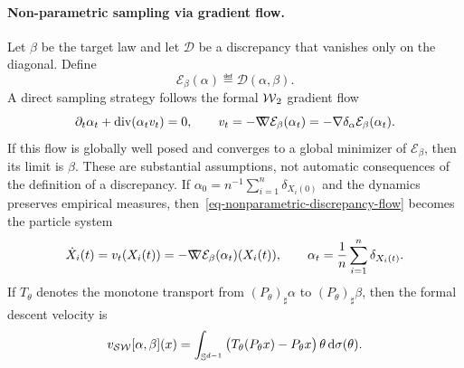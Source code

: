 \paragraph{Non-parametric sampling via gradient flow.}
Let $\beta$ be the target law and let $\mathcal D$ be a discrepancy that vanishes only on the diagonal. Define
\begin{equation}\label{eq-one-step-discrepancy-energy}
\mathcal E_\beta(\alpha)\eqdef\mathcal D(\alpha,\beta).
\end{equation}
A direct sampling strategy follows the formal $\operatorname{\mathcal{W}}_2$ gradient flow
\begin{equation}\label{eq-nonparametric-discrepancy-flow}
\partial_t\alpha_t+\operatorname{div}(\alpha_t v_t)=0,
\qquad
v_t=-\mathord{\nabla\mkern-9.3mu\nabla}\mathcal E_\beta(\alpha_t)
=-\nabla\delta_\alpha\mathcal E_\beta(\alpha_t).
\end{equation}
If this flow is globally well posed and converges to a global minimizer of $\mathcal E_\beta$, then its limit is $\beta$. These are substantial assumptions, not automatic consequences of the definition of a discrepancy. If $\alpha_0=n^{-1}\sum_{i=1}^n\delta_{X_i(0)}$ and the dynamics preserves empirical measures, then~\eqref{eq-nonparametric-discrepancy-flow} becomes the particle system
\begin{equation}\label{eq-nonparametric-particle-flow}
\dot X_i(t)=v_t(X_i(t))
=-\mathord{\nabla\mkern-9.3mu\nabla}\mathcal E_\beta(\alpha_t)(X_i(t)),
\qquad
\alpha_t=\frac1n\sum_{i=1}^n\delta_{X_i(t)}.
\end{equation}
If $T_\theta$ denotes the monotone transport from $(P_\theta)_\sharp\alpha$ to $(P_\theta)_\sharp\beta$, then the formal descent velocity is
\begin{equation}\label{eq-sliced-wasserstein-flow-velocity}
v_{\operatorname{\mathcal{SW}}}[\alpha,\beta](x)
=
\int_{\mathbb{S}^{d-1}}
\big(T_\theta(P_\theta x)-P_\theta x\big)\,\theta\,\mathrm{d}\sigma(\theta).
\end{equation}
